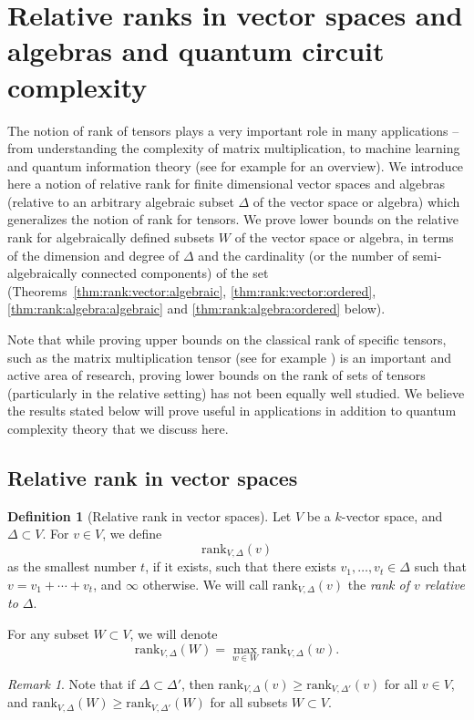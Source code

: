 \documentclass[10pt]{amsart}
\theoremstyle{definition}
\newtheorem{definition}{Definition}[section]
\theoremstyle{remark}
\newtheorem{remark}{Remark}
\numberwithin{equation}{section}
\newcommand{\rank}{\mathrm{rank}}
\begin{document}
\section{Relative ranks in vector spaces and algebras and quantum circuit complexity}
\label{subsec:rank}
The notion of rank of tensors plays a very important role
in many applications -- from understanding the complexity of matrix multiplication, to machine learning and  quantum information theory
(see for example \cite{Landsberg2019} for an overview). We introduce here 
a notion of relative rank for finite dimensional vector spaces and algebras (relative to an arbitrary algebraic subset $\Delta$ of the vector space or algebra) which generalizes the notion of rank for tensors. We prove lower bounds on the relative rank for algebraically defined subsets $W$ of the vector space or algebra,  in terms of the dimension and degree of $\Delta$ and the cardinality (or the number of semi-algebraically connected components) of the set (Theorems~\ref{thm:rank:vector:algebraic}, \ref{thm:rank:vector:ordered},
\ref{thm:rank:algebra:algebraic} and \ref{thm:rank:algebra:ordered} below).

Note that while proving upper bounds on the classical rank of specific tensors, such as the matrix multiplication tensor (see for example \cite{Landsberg2017,Landsberg2019}) is an important and active area of research, proving lower bounds on the rank of sets of 
tensors (particularly in the relative setting) has not been equally well studied. We believe the results stated below will prove useful in applications in addition to quantum complexity theory that we discuss here. 

\subsection{Relative rank in vector spaces}
\begin{definition}[Relative rank in vector spaces]
\label{def:rank:vector}
Let $V$ be a $k$-vector space, and $\Delta \subset V$. For $v \in V$, we define
\[
\rank_{V,\Delta}(v)
\]
as the smallest number $t$, if it exists, such that there exists $v_1,\ldots,v_t \in \Delta$ such that $v = v_1 + \cdots + v_t$,
and $\infty$ otherwise. We will call
$\rank_{V,\Delta}(v)$ the \emph{rank of $v$ relative to $\Delta$}.

For any subset $W \subset V$, we will denote 
\[
\rank_{V,\Delta}(W) = \max_{w \in W} \rank_{V,\Delta}(w).
\]
\end{definition}
\begin{remark}
\label{rem:rank:vector:monotone}
    Note that if $\Delta \subset \Delta'$, then $\rank_{V,\Delta}(v) \geq \rank_{V,\Delta'}(v)$ for all $v \in V$, and 
    $\rank_{V,\Delta}(W) \geq \rank_{V,\Delta'}(W)$ for all subsets 
    $W \subset V$.
\end{remark}
\end{document}
